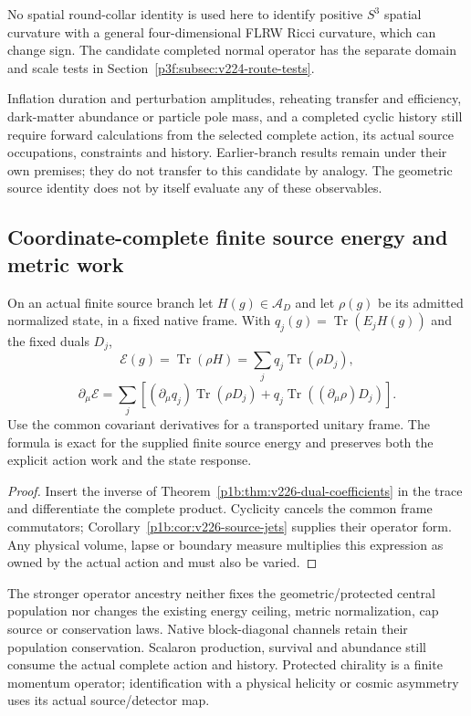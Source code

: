 \documentclass[12pt,a4paper]{article}
\begin{document}
No spatial round-collar identity is used here to identify positive
$S^3$ spatial curvature with a general four-dimensional FLRW Ricci
curvature, which can change sign. The candidate completed normal
operator has the separate domain and scale tests in
Section~\ref{p3f:subsec:v224-route-tests}.

Inflation duration and perturbation amplitudes, reheating transfer and
efficiency, dark-matter abundance or particle pole mass, and a completed
cyclic history still require forward calculations from the selected
complete action, its actual source occupations, constraints and history.
Earlier-branch results remain under their own premises; they do not
transfer to this candidate by analogy. The geometric source identity
does not by itself evaluate any of these observables.


\subsection{Coordinate-complete finite source energy and metric work}
\label{p8:sec:v226-native-energy-work}
\begin{proposition}
\label{p8:prop:v226-energy-work}
On an actual finite source branch let $H(g)\in\mathcal A_D$ and let
$\rho(g)$ be its admitted normalized state, in a fixed native frame.
With $q_j(g)=\operatorname{Tr}(E_jH(g))$ and the fixed duals $D_j$,
\[
 \mathcal E(g)=\operatorname{Tr}(\rho H)
       =\sum_jq_j\operatorname{Tr}(\rho D_j),
\]
\[
 \partial_\mu\mathcal E
 =\sum_j\left[(\partial_\mu q_j)\operatorname{Tr}(\rho D_j)
       +q_j\operatorname{Tr}((\partial_\mu\rho)D_j)\right].
\]
Use the common covariant derivatives for a transported unitary frame.
The formula is exact for the supplied finite source energy and preserves
both the explicit action work and the state response.
\end{proposition}
\begin{proof}
Insert the inverse of Theorem~\ref{p1b:thm:v226-dual-coefficients} in the
trace and differentiate the complete product. Cyclicity cancels the common
frame commutators; Corollary~\ref{p1b:cor:v226-source-jets} supplies their
operator form. Any physical volume, lapse or boundary measure multiplies
this expression as owned by the actual action and must also be varied.
\end{proof}
The stronger operator ancestry neither fixes the geometric/protected central
population nor changes the existing energy ceiling, metric normalization,
cap source or conservation laws. Native block-diagonal channels retain their
population conservation. Scalaron production, survival and abundance still
consume the actual complete action and history. Protected chirality is a
finite momentum operator; identification with a physical helicity or cosmic
asymmetry uses its actual source/detector map.
\end{document}
